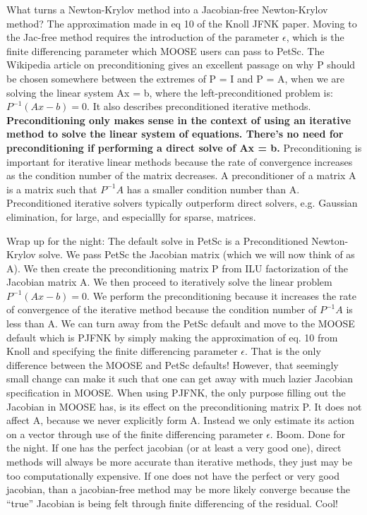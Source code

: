 {What turns a Newton-Krylov method into a Jacobian-free Newton-Krylov method? The approximation made in eq 10 of the Knoll JFNK paper. Moving to the Jac-free method requires the introduction of the parameter $\epsilon$, which is the finite differencing parameter which MOOSE users can pass to PetSc. The Wikipedia article on preconditioning gives an excellent passage on why P should be chosen somewhere between the extremes of P = I and P = A, when we are solving the linear system Ax = b, where the left-preconditioned problem is: $P^{-1}\left(Ax - b\right) = 0$. It also describes preconditioned iterative methods. \textbf{Preconditioning only makes sense in the context of using an iterative method to solve the linear system of equations. There's no need for preconditioning if performing a direct solve of Ax = b.} Preconditioning is important for iterative linear methods because the rate of convergence increases as the condition number of the matrix decreases. A preconditioner of a matrix A is a matrix such that $P^{-1}A$ has a smaller condition number than A. Preconditioned iterative solvers typically outperform direct solvers, e.g. Gaussian elimination, for large, and especiallly for sparse, matrices.

Wrap up for the night: The default solve in PetSc is a Preconditioned Newton-Krylov solve. We pass PetSc the Jacobian matrix (which we will now think of as A). We then create the preconditioning matrix P from ILU factorization of the Jacobian matrix A. We then proceed to iteratively solve the linear problem $P^{-1}\left(Ax - b\right) = 0$. We perform the preconditioning because it increases the rate of convergence of the iterative method because the condition number of $P^{-1}A$ is less than A. We can turn away from the PetSc default and move to the MOOSE default which is PJFNK by simply making the approximation of eq. 10 from Knoll and specifying the finite differencing parameter $\epsilon$. That is the only difference between the MOOSE and PetSc defaults! However, that seemingly small change can make it such that one can get away with much lazier Jacobian specification in MOOSE. When using PJFNK, the only purpose filling out the Jacobian in MOOSE has, is its effect on the preconditioning matrix P. It does not affect A, because we never explicitly form A. Instead we only estimate its action on a vector through use of the finite differencing parameter $\epsilon$. Boom. Done for the night. If one has the perfect jacobian (or at least a very good one), direct methods will always be more accurate than iterative methods, they just may be too computationally expensive. If one does not have the perfect or very good jacobian, than a jacobian-free method may be more likely converge because the ``true'' Jacobian is being felt through finite differencing of the residual. Cool!

}
